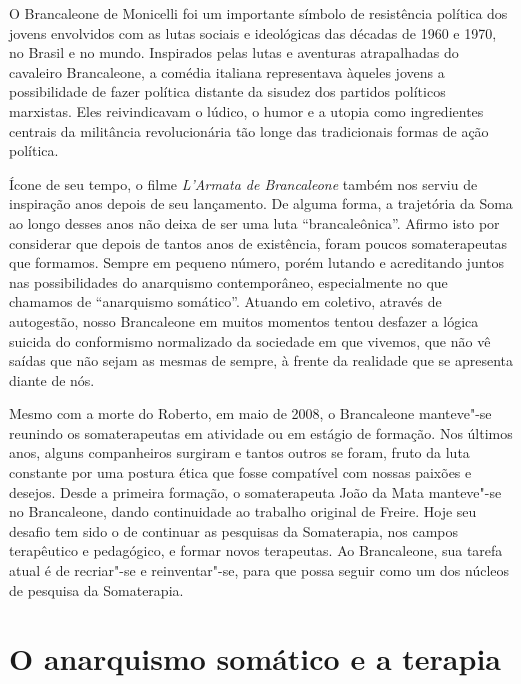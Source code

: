 O Brancaleone de Monicelli foi um importante símbolo de resistência
política dos jovens envolvidos com as lutas sociais e ideológicas das
décadas de 1960 e 1970, no Brasil e no mundo. Inspirados pelas lutas e
aventuras atrapalhadas do cavaleiro Brancaleone, a comédia italiana
representava àqueles jovens a possibilidade de fazer política
distante da sisudez dos partidos políticos marxistas. Eles reivindicavam
o lúdico, o humor e a utopia como ingredientes centrais da militância
revolucionária tão longe das tradicionais formas de ação política.

Ícone de seu tempo, o filme \emph{L'Armata de Brancaleone} também nos
serviu de inspiração anos depois de seu lançamento. De alguma forma, a
trajetória da Soma ao longo desses anos não deixa de ser uma luta
``brancaleônica''. Afirmo isto por considerar que depois de tantos anos
de existência, foram poucos somaterapeutas que formamos. Sempre em
pequeno número, porém lutando e acreditando juntos nas possibilidades do
anarquismo contemporâneo, especialmente no que chamamos de ``anarquismo
somático''. Atuando em coletivo, através de autogestão, nosso
Brancaleone em muitos momentos tentou desfazer a lógica suicida do
conformismo normalizado da sociedade em que vivemos, que não vê saídas
que não sejam as mesmas de sempre, à frente da realidade que se apresenta
diante de nós.

Mesmo com a morte do Roberto, em maio de 2008, o Brancaleone manteve"-se
reunindo os somaterapeutas em atividade ou em estágio de formação. Nos
últimos anos, alguns companheiros surgiram e tantos outros se foram,
fruto da luta constante por uma postura ética que fosse compatível com
nossas paixões e desejos. Desde a primeira formação, o somaterapeuta
João da Mata manteve"-se no Brancaleone, dando continuidade ao trabalho %
original de Freire. Hoje seu desafio tem sido o de continuar as
pesquisas da Somaterapia, nos campos terapêutico e pedagógico, e formar
novos terapeutas. Ao Brancaleone, sua tarefa atual é de recriar"-se e
reinventar"-se, para que possa seguir como um dos núcleos de pesquisa da
Somaterapia.

\section{O anarquismo somático e a terapia}


